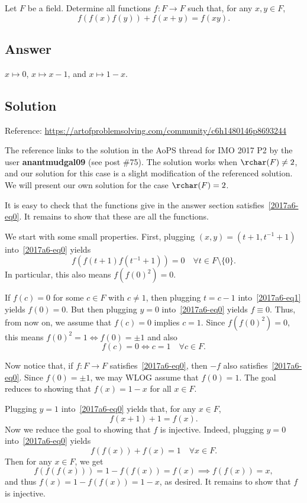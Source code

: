 Let $F$ be a field.
Determine all functions $f : F \to F$ such that, for any $x, y \in F$,
\[ f(f(x) f(y)) + f(x + y) = f(xy). \tag{*}\label{2017a6-eq0} \]



\subsection*{Answer}

$x \mapsto 0$, $x \mapsto x - 1$, and $x \mapsto 1 - x$.



\subsection*{Solution}

Reference: \url{https://artofproblemsolving.com/community/c6h1480146p8693244}

The reference links to the solution in the AoPS thread for IMO 2017 P2 by the user \textbf{anantmudgal09} (see post \#75).
The solution works when $\rchar(F) \neq 2$, and our solution for this case is a slight modification of the referenced solution.
We will present our own solution for the case $\rchar(F) = 2$.

It is easy to check that the functions give in the answer section satisfies~\eqref{2017a6-eq0}.
It remains to show that these are all the functions.

We start with some small properties.
First, plugging $(x, y) = (t + 1, t^{-1} + 1)$ into~\eqref{2017a6-eq0} yields
\[ f(f(t + 1) f(t^{-1} + 1)) = 0 \quad \forall t \in F \setminus \{0\}. \tag{1}\label{2017a6-eq1} \]
In particular, this also means $f(f(0)^2) = 0$.

If $f(c) = 0$ for some $c \in F$ with $c \neq 1$, then plugging $t = c - 1$ into~\eqref{2017a6-eq1} yields $f(0) = 0$.
But then plugging $y = 0$ into~\eqref{2017a6-eq0} yields $f \equiv 0$.
Thus, from now on, we assume that $f(c) = 0$ implies $c = 1$.
Since $f(f(0)^2) = 0$, this means $f(0)^2 = 1 \iff f(0) = \pm 1$ and also
\[ f(c) = 0 \iff c = 1 \quad \forall c \in F. \tag{2}\label{2017a6-eq2} \]

Now notice that, if $f : F \to F$ satisfies~\eqref{2017a6-eq0}, then $-f$ also satisfies~\eqref{2017a6-eq0}.
Since $f(0) = \pm 1$, we may WLOG assume that $f(0) = 1$.
The goal reduces to showing that $f(x) = 1 - x$ for all $x \in F$.

Plugging $y = 1$ into~\eqref{2017a6-eq0} yields that, for any $x \in F$,
\[ f(x + 1) + 1 = f(x). \tag{3}\label{2017a6-eq3} \]
Now we reduce the goal to showing that $f$ is injective.
Indeed, plugging $y = 0$ into~\eqref{2017a6-eq0} yields
\[ f(f(x)) + f(x) = 1 \quad \forall x \in F. \]
Then for any $x \in F$, we get
\[ f(f(f(x))) = 1 - f(f(x)) = f(x) \implies f(f(x)) = x, \]
    and thus $f(x) = 1 - f(f(x)) = 1 - x$, as desired.
It remains to show that $f$ is injective.

